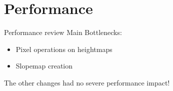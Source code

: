 \documentclass[18pt]{beamer}
\begin{document}
\section{Performance}
\begin{frame}{Performance review}
Main Bottlenecks:
\begin{itemize}
	\item Pixel operations on heightmaps
	\item Slopemap creation
\end{itemize}
\vspace{1.0cm}
The other changes had no severe performance impact!
\end{frame}
\end{document}
